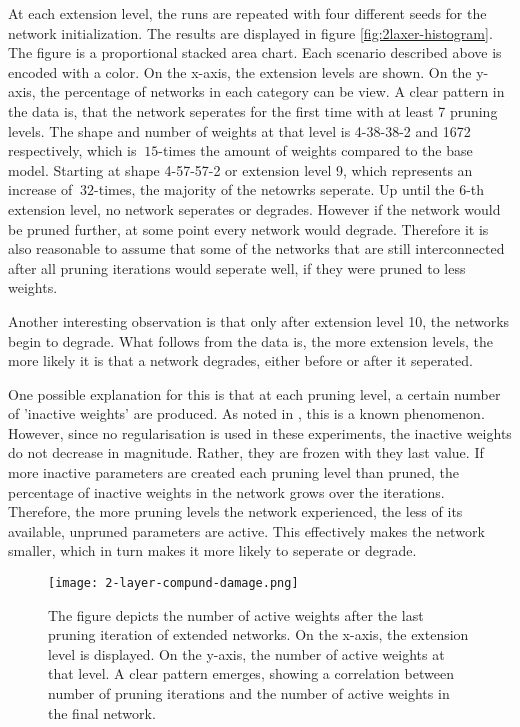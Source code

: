 At each extension level, the runs are repeated with four different seeds for the network initialization.
The results are displayed in figure \ref{fig:2laxer-histogram}.
The figure is a proportional stacked area chart.
Each scenario described above is encoded with a color.
On the x-axis, the extension levels are shown.
On the y-axis, the percentage of networks in each category can be view.
A clear pattern in the data is, that the network seperates for the first time with at least 7 pruning levels.
The shape and number of weights at that level is 4-38-38-2 and 1672 respectively, which is $~15$-times the amount of weights compared to the base model. 
Starting at shape 4-57-57-2 or extension level 9, which represents an increase of $~32$-times, the majority of the netowrks seperate.
Up until the 6-th extension level, no network seperates or degrades. 
However if the network would be pruned further, at some point every network would degrade.
Therefore it is also reasonable to assume that some of the networks that are still interconnected after all pruning iterations would seperate well, if they were pruned to less weights.

Another interesting observation is that only after extension level 10, the networks begin to degrade.
What follows from the data is, the more extension levels, the more likely it is that a network degrades, either before or after it seperated.

One possible explanation for this is that at each pruning level, a certain number of 'inactive weights' are produced.
As noted in \autocite{HanEtAl15, AllAlivePruning}, this is a known phenomenon.
However, since no regularisation is used in these experiments, the inactive weights do not decrease in magnitude.
Rather, they are frozen with they last value.
If more inactive parameters are created each pruning level than pruned, the percentage of inactive weights in the network grows over the iterations.
Therefore, the more pruning levels the network experienced, the less of its available, unpruned parameters are active.
This effectively makes the network smaller, which in turn makes it more likely to seperate or degrade.

\begin{figure}[ht]
    \centering
    \texttt{[image: 2-layer-compund-damage.png]}
    \caption{
        The figure depicts the number of active weights after the last pruning iteration of extended networks.
        On the x-axis, the extension level is displayed.
        On the y-axis, the number of active weights at that level.
        A clear pattern emerges, showing a correlation between number of pruning iterations and the number of active weights in the final network.
    }
    \label{fig:collateral_damage}
\end{figure}


